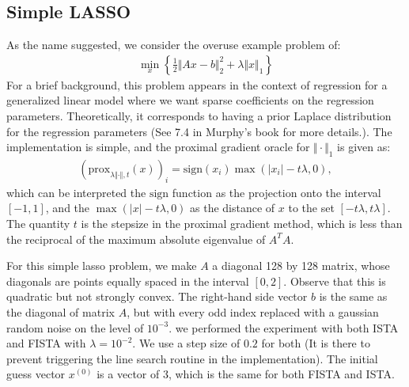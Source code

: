 \documentclass[]{article}
\theoremstyle{definition}
\begin{document}
    \subsection*{Simple LASSO}
        As the name suggested, we consider the overuse example problem of: 
        \begin{align*}
            \min_{x}\left\lbrace
                \frac{1}{2}\Vert Ax - b\Vert^2_2 + \lambda\Vert x\Vert_1    
            \right\rbrace
        \end{align*}
        For a brief background, this problem appears in the context of regression for a generalized linear model where we want sparse coefficients on the regression parameters. Theoretically, it corresponds to having a prior Laplace distribution for the regression parameters (See 7.4 in Murphy's\cite{book:ml_prob_murphy} book for more details.). The implementation is simple, and the proximal gradient oracle for $\Vert \cdot \Vert_1$ is given as: 
        \begin{align*}
           (\text{prox}_{\lambda\Vert \cdot \Vert, t}(x))_i
           = 
           \text{sign}(x_i)\max(|x_i| - t\lambda, 0), 
        \end{align*}
        which can be interpreted the $\text{sign}$ function as the projection onto the interval $[-1, 1]$, and the $\max(|x| - t\lambda, 0)$ as the distance of $x$ to the set $[-t\lambda, t\lambda]$. The quantity $t$ is the stepsize in the proximal gradient method, which is less than the reciprocal of the maximum absolute eigenvalue of $A^TA$. 
        \par
        For this simple lasso problem, we make $A$ a diagonal 128 by 128 matrix, whose diagonals are points equally spaced in the interval $[0, 2]$. Observe that this is quadratic but not strongly convex. The right-hand side vector $b$ is the same as the diagonal of matrix $A$, but with every odd index replaced with a gaussian random noise on the level of $10^{-3}$. we performed the experiment with both ISTA and FISTA with $\lambda = 10^{-2}$. We use a step size of $0.2$ for both (It is there to prevent triggering the line search routine in the implementation). The initial guess vector $x^{(0)}$ is a vector of 3, which is the same for both FISTA and ISTA. 
        \par
\end{document}

